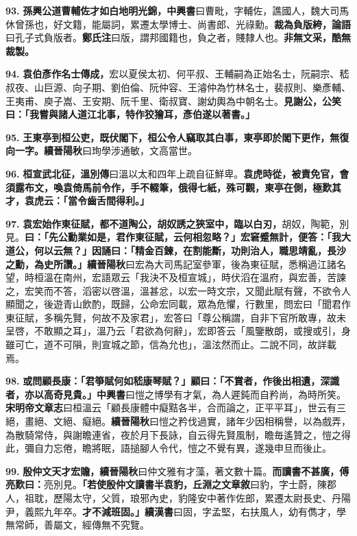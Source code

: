 \textbf{93.} \textbf{孫興公道曹輔佐才如白地明光錦，}{\footnotesize \textbf{中興書}曰曹毗，字輔佐，譙國人，魏大司馬休曾孫也，好文籍，能屬詞，累遷太學博士、尚書郎、光祿勳。}\textbf{裁為負版絝，}{\footnotesize \textbf{論語}曰孔子式負版者。\textbf{鄭氏注}曰版，謂邦國籍也，負之者，賤隸人也。}\textbf{非無文采，酷無裁製。}

\textbf{94.} \textbf{袁伯彥作名士傳成，}{\footnotesize 宏以夏侯太初、何平叔、王輔嗣為正始名士，阮嗣宗、嵇叔夜、山巨源、向子期、劉伯倫、阮仲容、王濬仲為竹林名士，裴叔則、樂彥輔、王夷甫、庾子嵩、王安期、阮千里、衛叔寶、謝幼輿為中朝名士。}\textbf{見謝公，公笑曰：「我嘗與諸人道江北事，特作狡獪耳，彥伯遂以著書。」}

\textbf{95.} \textbf{王東亭到桓公吏，既伏閣下，桓公令人竊取其白事，東亭即於閣下更作，無復向一字。}{\footnotesize \textbf{續晉陽秋}曰珣學涉通敏，文高當世。}

\textbf{96.} \textbf{桓宣武北征，}{\footnotesize \textbf{溫別傳}曰溫以太和四年上疏自征鮮卑。}\textbf{袁虎時從，被責免官，會須露布文，喚袁倚馬前令作，手不輟筆，俄得七紙，殊可觀，東亭在側，極歎其才，袁虎云：「當令齒舌間得利。」}

\textbf{97.} \textbf{袁宏始作東征賦，都不道陶公，胡奴誘之狹室中，臨以白刃，}{\footnotesize 胡奴，陶範，別見。}\textbf{曰：「先公勳業如是，君作東征賦，云何相忽略？」宏窘蹙無計，便答：「我大道公，何以云無？」因誦曰：「精金百鍊，在割能斷，功則治人，職思靖亂，長沙之勳，為史所讚。」}{\footnotesize \textbf{續晉陽秋}曰宏為大司馬記室參軍，後為東征賦，悉稱過江諸名望，時桓溫在南州，宏語眾云「我決不及桓宣城」，時伏滔在溫府，與宏善，苦諫之，宏笑而不答，滔密以啓溫，溫甚忿，以宏一時文宗，又聞此賦有聲，不欲令人顯聞之，後遊青山飲酌，既歸，公命宏同載，眾為危懼，行數里，問宏曰「聞君作東征賦，多稱先賢，何故不及家君」，宏答曰「尊公稱謂，自非下官所敢專，故未呈啓，不敢顯之耳」，溫乃云「君欲為何辭」，宏即答云「風鑒散朗，或搜或引，身雖可亡，道不可隕，則宣城之節，信為允也」，溫泫然而止。二說不同，故詳載焉。}

\textbf{98.} \textbf{或問顧長康：「君箏賦何如嵇康琴賦？」顧曰：「不賞者，作後出相遺，深識者，亦以高奇見貴。」}{\footnotesize \textbf{中興書}曰愷之博學有才氣，為人遲鈍而自矜尚，為時所笑。\textbf{宋明帝文章志}曰桓溫云「顧長康體中癡黠各半，合而論之，正平平耳」，世云有三絕，畫絕、文絕、癡絕。\textbf{續晉陽秋}曰愷之矜伐過實，諸年少因相稱譽，以為戲弄，為散騎常侍，與謝瞻連省，夜於月下長詠，自云得先賢風制，瞻毎遙贊之，愷之得此，彌自力忘倦，瞻將眠，語搥腳人令代，愷之不覺有異，遂幾申旦而後止。}

\textbf{99.} \textbf{殷仲文天才宏贍，}{\footnotesize \textbf{續晉陽秋}曰仲文雅有才藻，著文數十篇。}\textbf{而讀書不甚廣，傅亮歎曰：}{\footnotesize 亮別見。}\textbf{「若使殷仲文讀書半袁豹，}{\footnotesize \textbf{丘淵之文章敘}曰豹，字士蔚，陳郡人，祖耽，歷陽太守，父質，琅邪內史，豹隆安中著作佐郎，累遷太尉長史、丹陽尹，義熙九年卒。}\textbf{才不減班固。」}{\footnotesize \textbf{續漢書}曰固，字孟堅，右扶風人，幼有儁才，學無常師，善屬文，經傳無不究覽。}

